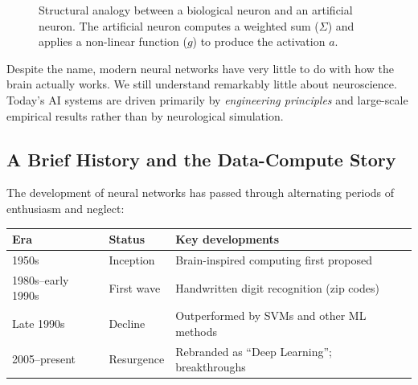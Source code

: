 \begin{figure}[h]
\centering
{}
\caption{Structural analogy between a biological neuron and an artificial
neuron. The artificial neuron computes a weighted sum ($\Sigma$) and applies a
non-linear function ($g$) to produce the activation $a$.}
\label{fig:bio-neuron}
\end{figure}

\begin{remark}
Despite the name, modern neural networks have very little to do with how the
brain actually works. We still understand remarkably little about neuroscience.
Today's AI systems are driven primarily by \textit{engineering principles} and
large-scale empirical results rather than by neurological simulation.
\end{remark}

\subsection{A Brief History and the Data-Compute Story}

The development of neural networks has passed through alternating periods of
enthusiasm and neglect:

\begin{center}
\begin{tabular}{lll}
\toprule
\textbf{Era} & \textbf{Status} & \textbf{Key developments}\\
\midrule
1950s & Inception & Brain-inspired computing first proposed\\
1980s--early 1990s & First wave & Handwritten digit recognition (zip codes)\\
Late 1990s & Decline & Outperformed by SVMs and other ML methods\\
2005--present & Resurgence & Rebranded as ``Deep Learning''; breakthroughs\\
\bottomrule
\end{tabular}
\end{center}


